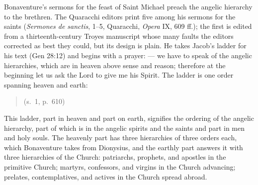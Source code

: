 Bonaventure's sermons for the feast of Saint Michael preach the angelic
hierarchy to the brethren. The Quaracchi editors print five among his
sermons for the saints
(\emph{Sermones de sanctis},  1--5, Quaracchi,
\emph{Opera} IX, 609 ff.); the first is edited from a thirteenth-century
Troyes manuscript whose many faults the editors corrected as best they
could, but its design is plain. He takes Jacob's ladder for his text (Gen
28:12) and begins with a prayer:  --- we have to speak of the
angelic hierarchies, which are in heaven above sense and reason; therefore
at the beginning let us ask the Lord to give me his Spirit. The ladder is
one order spanning heaven and earth:
\begin{quote}
 (s.~1, p.~610)
\end{quote}
This ladder, part in heaven and part on earth, signifies the ordering of the
angelic hierarchy, part of which is in the angelic spirits and the saints
and part in men and holy souls. The heavenly part has three hierarchies of
three orders each, which Bonaventure takes from Dionysius, and the earthly
part answers it with three hierarchies of the Church: patriarchs, prophets,
and apostles in the primitive Church; martyrs, confessors, and virgins in
the Church advancing; prelates, contemplatives, and actives in the Church
spread abroad.

